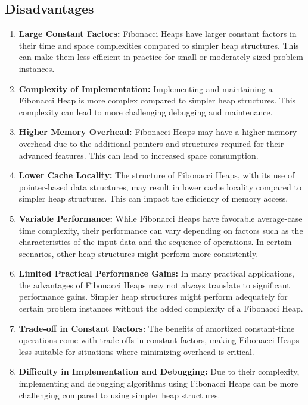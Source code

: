 \documentclass[12pt, a4paper]{article}
\begin{document}
\subsection{Disadvantages}

\begin{enumerate}
	\item \textbf{Large Constant Factors:} Fibonacci Heaps have larger constant factors in their time and space complexities compared to simpler heap structures. This can make them less efficient in practice for small or moderately sized problem instances.\cite{cormen2022introduction}
	
	\item \textbf{Complexity of Implementation:} Implementing and maintaining a Fibonacci Heap is more complex compared to simpler heap structures. This complexity can lead to more challenging debugging and maintenance.
	
	\item \textbf{Higher Memory Overhead:} Fibonacci Heaps may have a higher memory overhead due to the additional pointers and structures required for their advanced features. This can lead to increased space consumption.\cite{cormen2022introduction}
	
	\item \textbf{Lower Cache Locality:} The structure of Fibonacci Heaps, with its use of pointer-based data structures, may result in lower cache locality compared to simpler heap structures. This can impact the efficiency of memory access.
	
	\item \textbf{Variable Performance:} While Fibonacci Heaps have favorable average-case time complexity, their performance can vary depending on factors such as the characteristics of the input data and the sequence of operations. In certain scenarios, other heap structures might perform more consistently.
	
	\item \textbf{Limited Practical Performance Gains:} In many practical applications, the advantages of Fibonacci Heaps may not always translate to significant performance gains. Simpler heap structures might perform adequately for certain problem instances without the added complexity of a Fibonacci Heap.
	
	\item \textbf{Trade-off in Constant Factors:} The benefits of amortized constant-time operations come with trade-offs in constant factors, making Fibonacci Heaps less suitable for situations where minimizing overhead is critical.
	
	\item \textbf{Difficulty in Implementation and Debugging:} Due to their complexity, implementing and debugging algorithms using Fibonacci Heaps can be more challenging compared to using simpler heap structures.
	
\end{enumerate}
\end{document}
